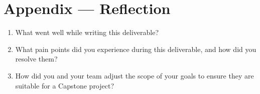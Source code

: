\documentclass{article}
\begin{document}
    \newpage{}

    \section*{Appendix --- Reflection}

    

    \begin{enumerate}
        \item What went well while writing this deliverable?
        \item What pain points did you experience during this deliverable, and how
        did you resolve them?
        \item How did you and your team adjust the scope of your goals to ensure
        they are suitable for a Capstone project?
    \end{enumerate}
\end{document}
